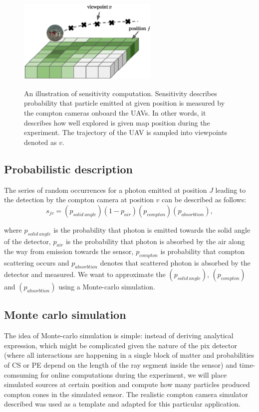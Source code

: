 \begin{figure}[!h]
  \centering
    \includegraphics[width=0.6\textwidth]{./fig/photos/sen.eps}
    \label{fig:sen_illustration}
  \caption{An illustration of sensitivity computation. Sensitivity describes probability that particle emitted at given position is measured by the compton cameras onboard the \ac{UAV}s. In other words, it describes how well explored is given map position during the experiment. The trajectory of the \ac{UAV} is sampled into viewpoints denoted as $v$.}
\end{figure}

\subsection{Probabilistic description}

The series of random occurrences for a photon emitted at position $J$ leading to the detection by the compton camera at position $v$ can be described as follows:
\begin{equation}
  s_{jv} =  (p_{solid\ angle})(1-p_{air})(p_{compton})(p_{absorbtion}),
\end{equation}

where $p_{solid\ angle}$ is the probability that photon is emitted towards the solid angle of the detector, $p_{air}$ is the probability that photon is absorbed by the air along the way from emission towards the sensor, $p_{compton}$ is probability that compton scattering occurs and $p_{absorbtion}$ denotes that scattered photon is absorbed by the detector and measured.
We want to approximate the $(p_{solid\ angle})$, $(p_{compton})$ and $(p_{absorbtion})$ using a Monte-carlo simulation.

\subsection{Monte carlo simulation}
The idea of Monte-carlo simulation is simple:
instead of deriving analytical expression,
which might be complicated given the nature of the \ac{pix} detector (where all interactions are happening in a single block of matter and probabilities of \ac{CS} or \ac{PE} depend on the length of the ray segment inside the sensor) and time-comsuming for online computations during the experiment,
we will place simulated sources at certain position and compute how many particles produced compton cones in the simulated sensor.
The realistic compton camera simulator described \cite{baca2019timepix} was used as a template and adapted for this particular application.


